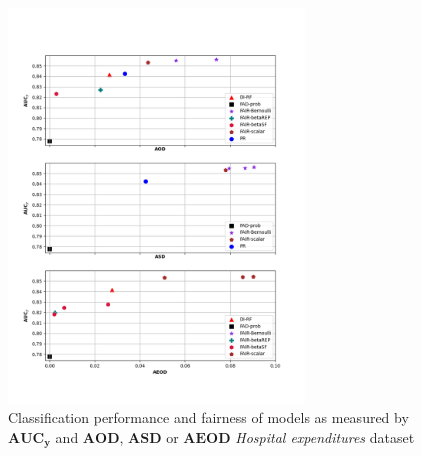 \documentclass[preprint,12pt]{elsarticle}
\begin{document}
\begin{figure}
	\center
	\includegraphics[angle=0, width=0.7\textwidth]{MEPS19.png}
	\captionsetup{justification=centering}
	\caption{Classification performance and fairness of models as measured by $\mathbf{AUC_y}$ and $\mathbf{AOD}$, $\mathbf{ASD}$ or $\mathbf{AEOD}$ \textit{Hospital expenditures} dataset}
	\label{fig:MEPS19}
	\vskip -0.2in
\end{figure}
\end{document}
